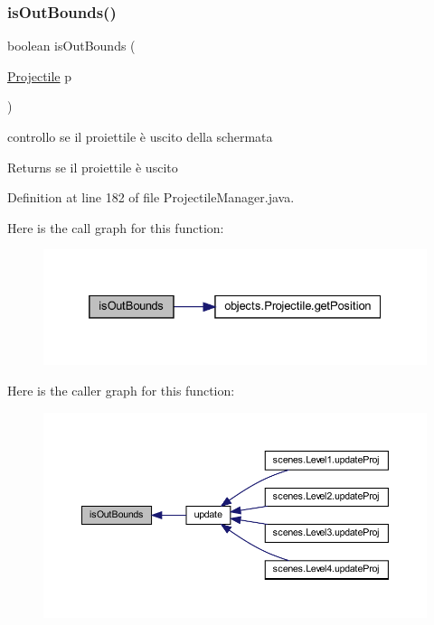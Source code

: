 \subsubsection{\texorpdfstring{is\+Out\+Bounds()}{isOutBounds()}}
{\footnotesize\ttfamily boolean is\+Out\+Bounds (\begin{DoxyParamCaption}\item[{\hyperlink{classobjects_1_1_projectile}{Projectile}}]{p }\end{DoxyParamCaption})}



controllo se il proiettile è uscito della schermata 

\begin{DoxyReturn}{Returns}
se il proiettile è uscito 
\end{DoxyReturn}


Definition at line 182 of file Projectile\+Manager.\+java.

Here is the call graph for this function\+:\nopagebreak
\begin{figure}[H]
\begin{center}
\leavevmode
\includegraphics[width=332pt]{classmanagers_1_1_projectile_manager_a57d53b4aface986fa08a24dab39b621d_cgraph}
\end{center}
\end{figure}
Here is the caller graph for this function\+:\nopagebreak
\begin{figure}[H]
\begin{center}
\leavevmode
\includegraphics[width=350pt]{classmanagers_1_1_projectile_manager_a57d53b4aface986fa08a24dab39b621d_icgraph}
\end{center}
\end{figure}
\mbox{\label{classmanagers_1_1_projectile_manager_a90bf53002c3a067a25aba3e876974051}} 
